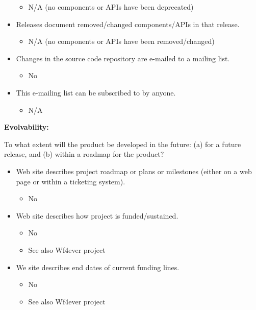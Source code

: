 \begin{itemize}
  \begin{itemize}
  \itemsep1pt\parskip0pt
  \item
    N/A (no components or APIs have been deprecated)
  \end{itemize}
\item
  Releases document removed/changed components/APIs in that release.

  \begin{itemize}
  \itemsep1pt\parskip0pt
  \item
    N/A (no components or APIs have been removed/changed)
  \end{itemize}
\item
  Changes in the source code repository are e-mailed to a mailing list.

  \begin{itemize}
  \itemsep1pt\parskip0pt
  \item
    No
  \end{itemize}
\item
  This e-mailing list can be subscribed to by anyone.

  \begin{itemize}
  \itemsep1pt\parskip0pt
  \item
    N/A
  \end{itemize}
\end{itemize}

\textbf{Evolvability:}

To what extent will the product be developed in the future: (a) for a
future release, and (b) within a roadmap for the product?

\begin{itemize}
\itemsep1pt\parskip0pt
\item
  Web site describes project roadmap or plans or milestones (either on a
  web page or within a ticketing system).

  \begin{itemize}
  \itemsep1pt\parskip0pt
  \item
    No
  \end{itemize}
\item
  Web site describes how project is funded/sustained.

  \begin{itemize}
  \itemsep1pt\parskip0pt
  \item
    No
  \item
    See also Wf4ever project
  \end{itemize}
\item
  We site describes end dates of current funding lines.

  \begin{itemize}
  \itemsep1pt\parskip0pt
  \item
    No
  \item
    See also Wf4ever project
  \end{itemize}
\end{itemize}

